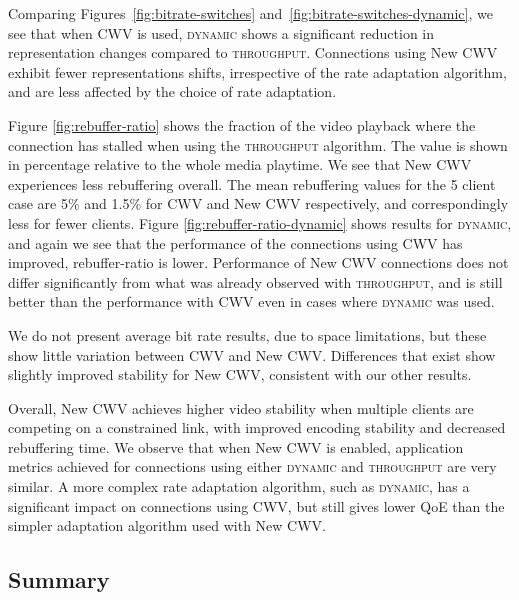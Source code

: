 \documentclass[10pt,sigconf]{acmart}
\begin{document}
Comparing Figures~\ref{fig:bitrate-switches} and~\ref{fig:bitrate-switches-dynamic}, we see that when CWV is used, \textsc{dynamic} shows a significant reduction in representation changes compared to \textsc{throughput}. Connections using New CWV exhibit fewer representations shifts, irrespective of the rate adaptation algorithm, and are less affected by the choice of rate adaptation.


Figure \ref{fig:rebuffer-ratio} shows the fraction of the video playback where the connection has stalled when using the \textsc{throughput} algorithm. The value is shown in percentage relative to the whole media playtime. We see that New CWV experiences less rebuffering overall. The mean rebuffering values for the 5 client case are 5\% and 1.5\% for CWV and New CWV respectively, and correspondingly less for fewer clients. 
Figure \ref{fig:rebuffer-ratio-dynamic} shows results for \textsc{dynamic}, and again we see that the performance of the connections using CWV has improved, rebuffer-ratio is lower. Performance of New CWV connections does not differ significantly from what was already observed with \textsc{throughput}, and is still better than the performance with CWV even in cases where \textsc{dynamic} was used.

We do not present average bit rate results, due to space limitations, but these show little variation between CWV and New CWV. Differences that exist show slightly improved stability for New CWV, consistent with our other results.


Overall, New CWV achieves higher video stability when multiple clients are competing on a constrained link, with improved encoding stability and decreased rebuffering time. 
We observe that when New CWV is enabled, application metrics achieved for connections using either \textsc{dynamic} and \textsc{throughput} are very similar. A more complex rate adaptation algorithm, such as \textsc{dynamic}, has a significant impact on connections using CWV, but still gives lower QoE than the simpler adaptation algorithm used with New CWV.

\subsection{Summary}
\label{sec:summary}
\end{document}
